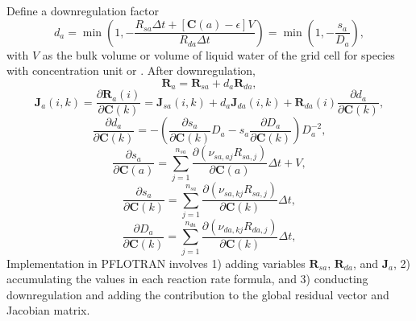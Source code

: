 \documentclass[gmd, manuscript]{copernicus}
\begin{document}
Define a downregulation factor  
\begin{equation}
d_a=\min\left(1, -\frac{R_{sa} \Delta t + \left[\mathbf{C}(a)-\epsilon\right]
V} {R_{da} \Delta t}\right)=\min\left(1, -\frac{s_a}{D_a}\right),
\end{equation} 
with $V$ as the bulk volume or volume of liquid water of the grid cell for
species with concentration unit  or . After
downregulation,
\begin{equation}
\mathbf{R}_a=\mathbf{R}_{sa}+d_a \mathbf{R}_{da},
\end{equation}
\begin{equation}
\mathbf{J}_a (i,k)=\frac{\partial \mathbf{R}_a(i)}{\partial \mathbf{C}(k)}
=\mathbf{J}_{sa} (i,k)+d_a \mathbf{J}_{da} (i,k)+\mathbf{R}_{da} (i)
\frac{\partial d_a}{\partial \mathbf{C}(k)}, 
\end{equation}
\begin{equation}
\frac{\partial d_a}{\partial \mathbf{C}(k)} =-\left(\frac{\partial
s_a}{\partial \mathbf{C}(k)} D_a - s_a \frac{\partial D_a}{\partial
\mathbf{C}(k)}\right)D_a^{-2}, 
\end{equation}
\begin{equation}
\frac{\partial s_a}{\partial \mathbf{C}(a)} =\sum_{j=1}^{n_{sa}}
\frac{\partial (\nu_{sa,aj}R_{sa,j})}{\partial \mathbf{C}(a)} \Delta t + V, 
\end{equation}
\begin{equation}
\frac{\partial s_a}{\partial \mathbf{C}(k)} =\sum_{j=1}^{n_{sa}}
\frac{\partial (\nu_{sa,kj}R_{sa,j})}{\partial \mathbf{C}(k)} \Delta t, 
\end{equation}
\begin{equation}
\frac{\partial D_a}{\partial \mathbf{C}(k)} =\sum_{j=1}^{n_{da}}
\frac{\partial (\nu_{da,kj}R_{da,j})}{\partial \mathbf{C}(k)} \Delta t, 
\end{equation}
Implementation in PFLOTRAN involves 1) adding variables $\mathbf{R}_{sa}$,
$\mathbf{R}_{da}$, and $\mathbf{J}_a$, 2) accumulating the values in each
reaction rate formula, and 3) conducting downregulation and adding the
contribution to the global residual vector and Jacobian matrix. 
\end{document}
